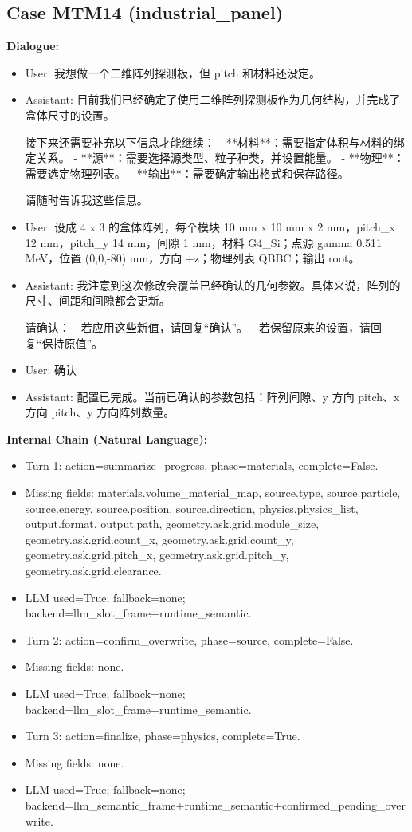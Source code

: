 \documentclass[11pt]{ctexart}
\begin{document}
\subsection{Case MTM14 (industrial\_panel)}
\textbf{Dialogue:}
\begin{itemize}
\item User: 我想做一个二维阵列探测板，但 pitch 和材料还没定。
\item Assistant: 目前我们已经确定了使用二维阵列探测板作为几何结构，并完成了盒体尺寸的设置。

接下来还需要补充以下信息才能继续：
- **材料**：需要指定体积与材料的绑定关系。
- **源**：需要选择源类型、粒子种类，并设置能量。
- **物理**：需要选定物理列表。
- **输出**：需要确定输出格式和保存路径。

请随时告诉我这些信息。
\item User: 设成 4 x 3 的盒体阵列，每个模块 10 mm x 10 mm x 2 mm，pitch\_x 12 mm，pitch\_y 14 mm，间隙 1 mm，材料 G4\_Si；点源 gamma 0.511 MeV，位置 (0,0,-80) mm，方向 +z；物理列表 QBBC；输出 root。
\item Assistant: 我注意到这次修改会覆盖已经确认的几何参数。具体来说，阵列的尺寸、间距和间隙都会更新。

请确认：
- 若应用这些新值，请回复“确认”。
- 若保留原来的设置，请回复“保持原值”。
\item User: 确认
\item Assistant: 配置已完成。当前已确认的参数包括：阵列间隙、y 方向 pitch、x 方向 pitch、y 方向阵列数量。
\end{itemize}
\textbf{Internal Chain (Natural Language):}
\begin{itemize}
\item Turn 1: action=summarize\_progress, phase=materials, complete=False.
\item Missing fields: materials.volume\_material\_map, source.type, source.particle, source.energy, source.position, source.direction, physics.physics\_list, output.format, output.path, geometry.ask.grid.module\_size, geometry.ask.grid.count\_x, geometry.ask.grid.count\_y, geometry.ask.grid.pitch\_x, geometry.ask.grid.pitch\_y, geometry.ask.grid.clearance.
\item LLM used=True; fallback=none; backend=llm\_slot\_frame+runtime\_semantic.
\item Turn 2: action=confirm\_overwrite, phase=source, complete=False.
\item Missing fields: none.
\item LLM used=True; fallback=none; backend=llm\_slot\_frame+runtime\_semantic.
\item Turn 3: action=finalize, phase=physics, complete=True.
\item Missing fields: none.
\item LLM used=True; fallback=none; backend=llm\_semantic\_frame+runtime\_semantic+confirmed\_pending\_overwrite.
\end{itemize}
\end{document}
